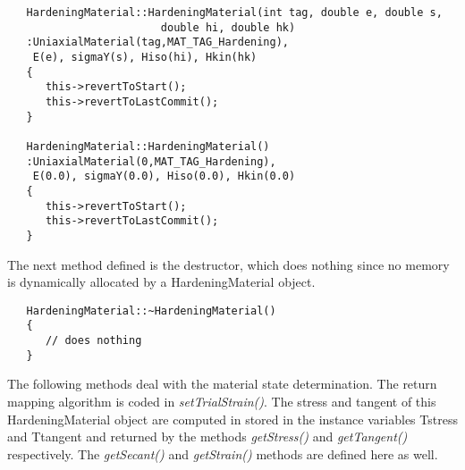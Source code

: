 \documentclass[12pt]{article}
\begin{document}
{\sf\small
\begin{verbatim}
   HardeningMaterial::HardeningMaterial(int tag, double e, double s,
                        double hi, double hk)
   :UniaxialMaterial(tag,MAT_TAG_Hardening),
    E(e), sigmaY(s), Hiso(hi), Hkin(hk)
   {
      this->revertToStart();
      this->revertToLastCommit();
   }

   HardeningMaterial::HardeningMaterial()
   :UniaxialMaterial(0,MAT_TAG_Hardening),
    E(0.0), sigmaY(0.0), Hiso(0.0), Hkin(0.0)
   {
      this->revertToStart();
      this->revertToLastCommit();
   }
\end{verbatim}
}

\noindent The next method defined is the destructor, which does nothing since no memory
is dynamically allocated by a HardeningMaterial object.

{\sf\small
\begin{verbatim}
   HardeningMaterial::~HardeningMaterial()
   {
      // does nothing
   }
\end{verbatim}
}

\noindent The following methods deal with the material state determination. The return
mapping algorithm is coded in {\em setTrialStrain()}. The stress and tangent of this HardeningMaterial
object are computed in stored in the instance variables Tstress and Ttangent and returned
by the methods {\em getStress()} and {\em getTangent()} respectively. The {\em getSecant()} and {\em getStrain()}
methods are defined here as well.
\end{document}
